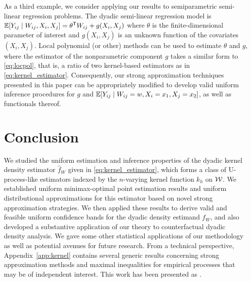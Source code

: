 As a third example, we consider applying our results to
semiparametric semi-linear regression problems.
The dyadic semi-linear regression model is
%
$\mathbb{E}[Y_{i j} \mid W_{i j}, X_i, X_j]
= \theta^{\mathsf{T}} W_{i j} + g(X_i, X_j)$
%
where $\theta$ is the finite-dimensional parameter
of interest
and $g(X_i, X_j)$ is an unknown
function of the covariates
$(X_i, X_j)$.
Local polynomial (or other) methods can be used to
estimate $\theta$ and $g$,
where the estimator of the nonparametric component
$g$ takes a similar form to \eqref{eq:locpol},
that is, a ratio of two kernel-based
estimators as in \eqref{eq:kernel_estimator}.
Consequently, our strong approximation techniques
presented in this paper can be appropriately modified
to develop valid uniform inference procedures for
$g$ and $\mathbb{E}[Y_{i j} \mid W_{i j}=w, X_i=x_1, X_j=x_2]$,
as well as functionals thereof.

\section{Conclusion}
\label{sec:conclusion}

We studied the uniform estimation and inference properties of the
dyadic kernel density estimator
$\hat{f}_W$ given in \eqref{eq:kernel_estimator},
which forms a class
of U-process-like estimators
indexed by the $n$-varying kernel function $k_h$ on $\mathcal{W}$.
We established uniform minimax-optimal point estimation results
and uniform distributional approximations for this estimator
based on novel strong approximation strategies.
We then applied these results to derive valid
and feasible uniform confidence bands for
the dyadic density estimand $f_W$,
and also developed a substantive application of our theory to
counterfactual dyadic density analysis.
We gave some other statistical
applications of our methodology as well as
potential avenues for future research.
From a technical perspective,
Appendix~\ref{app:kernel} contains several generic results
concerning strong approximation methods and maximal inequalities
for empirical processes that may be of independent interest.
This work has been presented as
%
\cite{%
  cattaneo2022talkgeorgia,%
  cattaneo2022talkcolumbia,%
  feng2022talkrenmin,%
  feng2022talkxiamen,%
  feng2023talkpeking,%
  feng2023talksingapore%
}.
